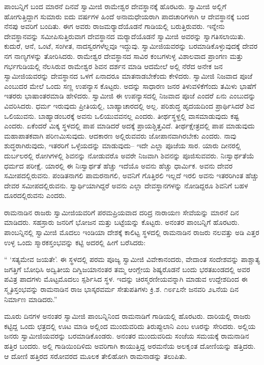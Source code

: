  ಪಾಂಬನ್ನಿಗೆ ಬಂದ ಮಾರನೆ ದಿನವೆ ಸ್ವಾಮೀಜಿ ರಾಮೇಶ್ವರ ದೇವಸ್ಥಾನಕ್ಕೆ ಹೊರಟರು. ಸ್ವಾಮೀಜಿ ಅಲ್ಲಿಗೆ ಹೋಗುತ್ತಿದ್ದಾಗ ಸುಮಾರು ಐದು ವರ್ಷಗಳ ಹಿಂದೆ ಅನಾಮಧೇಯರಾಗಿ ಪಾದಚಾರಿಗಳಾಗಿ ಆ ದೇವಸ್ಥಾನಕ್ಕೆ ಬಂದ ನೆನಪು ಅವರಿಗೆ ಬಂದಿತು. ಈಗ ಅವರು ರಾಜಮರ‍್ಯಾದೆಯೊಡನೆ ಗಾಡಿಯಲ್ಲಿ ಬರುತ್ತಿರುವರು. ಇನ್ನೇನು ದೇವಸ್ಥಾನವನ್ನು ಸಮೀಪಿಸುತ್ತಿರುವಾಗ ದೇವಸ್ಥಾನದ ಮರ‍್ಯಾದೆಯೊಡನೆ ಸ್ವಾಮೀಜಿ ಅವರನ್ನು ಸ್ವಾಗತಿಸಲಾಯಿತು. ಕುದುರೆ, ಆನೆ, ಒಂಟೆ, ಸಂಗೀತ, ನಾದಸ್ವರಗಳೆಲ್ಲವೂ ಇದ್ದುವು. ಸ್ವಾಮೀಜಿಯವರನ್ನು ಬರಮಾಡಿಕೊಳ್ಳುವುದಕ್ಕೆ ದೇವರ ನಗ ನಾಣ್ಯಗಳನ್ನು ತೋರಿಸಿದರು. ರಾಮೇಶ್ವರ ದೇವಸ್ಥಾನದ ಸಾವಿರ ಕಂಬಗಳುಳ್ಳ ವಿಶಾಲವಾದ ಪ್ರಾಂಗಣ ಮತ್ತು ಗರ್ಭಗುಡಿಯಲ್ಲಿ ನೆಲಸಿರುವ ರಾಮೇಶ್ವರ ಶಿವನ ದರ್ಶನ ಮಾಡಿ ಆದಮೇಲೆ ಅಲ್ಲಿ ನೆರೆದ ಅನೇಕ ಜನ ಸ್ವಾಮೀಜಿಯವರನ್ನು ದೇವಸ್ಥಾನದ ಒಳಗೆ ಏನಾದರೂ ಮಾತನಾಡಬೇಕೆಂದು ಕೇಳಿದರು. ಸ್ವಾಮೀಜಿ ನಿಜವಾದ ಪೂಜೆ ಎಂಬುದರ ಮೇಲೆ ಒಂದು ಸಣ್ಣ ಉಪನ್ಯಾಸ ಕೊಟ್ಟರು. ಅದನ್ನು ಸಾಧಾರಣ ಜನರ ತಿಳುವಳಿಕೆಗೆಂದು ತಮಿಳು ಭಾಷೆಗೆ ಇತರರು ಭಾಷಾಂತರಮಾಡಿ ಹೇಳಿದರು. ಸ್ವಾಮೀಜಿ ಈ ಉಪನ್ಯಾಸದಲ್ಲಿ ನಿಜವಾದ ಪೂಜೆ ಎಂದರೆ ಏನು ಎಂಬುದನ್ನು ವಿವರಿಸಿದರು. ಧರ್ಮ ಇರುವುದು ಪ್ರೀತಿಯಲ್ಲಿ, ಬಾಹ್ಯಾಚಾರದಲ್ಲಿ ಅಲ್ಲ. ಪರಿಶುದ್ಧ ಹೃದಯದಿಂದ ಪ್ರಾರ್ಥಿಸಿದರೆ ಶಿವ ಒಲಿಯುವನು. ಬಾಹ್ಯಾಡಂಬರಕ್ಕೆ ಅವನು ಒಲಿಯುವವನಲ್ಲ ಎಂದರು. ತೀರ್ಥಸ್ಥಳ್ದಲ್ಲಿ ವಾಸಮಾಡುವುದು ಕಷ್ಟ ಎಂದರು. ಏಕೆಂದರೆ ಮಿಕ್ಕ ಸ್ಥಳದಲ್ಲಿ ಪಾಪ ಮಾಡಿದರೆ ಅದಕ್ಕೆ ಪ್ರಾಯಶ್ಚಿತ್ತವಿದೆ. ತೀರ್ಥಕ್ಷೇತ್ರದಲ್ಲಿ ಪಾಪ ಮಾಡುವುದು ಮಹಾಪಾತಕವಾಗಿ ಪರಿಣಮಿಸುವುದು. ಆದಕಾರಣ ಅಲ್ಲಿರುವವರು ಜೋಪಾನವಾಗಿರಬೇಕು ಎಂದರು. ನಾವು ಶುದ್ಧರಾಗಿರುವುದು, ಇತರರಿಗೆ ಒಳ್ಳೆಯದನ್ನು ಮಾಡುವುದು– ಇದೇ ಎಲ್ಲಾ ಪೂಜೆಯ ಸಾರ. ಯಾರು ದೀನರಲ್ಲಿ ದುರ್ಬಲರಲ್ಲಿ ರೋಗಿಗಳಲ್ಲಿ ಶಿವನನ್ನು ನೋಡುವರೊ ಅವರೇ ನಿಜವಾಗಿ ಶಿವನನ್ನು ಪೂಜಿಸುವವರು. ನಿಃಸ್ವಾರ್ಥತೆಯೆ ಧರ್ಮದ ಪರೀಕ್ಷೆ. ಯಾರಲ್ಲಿ ಈ ನಿಃಸ್ವಾರ್ಥತೆ ಹೆಚ್ಚು ಇದೆಯೊ ಅವನು ಹೆಚ್ಚು ಧಾರ್ಮಿಕ. ಅವನು ದೇವರ ಸಮೀಪದಲ್ಲಿರುವನು. ಪಂಡಿತನಾಗಲಿ ಪಾಮರನಾಗಲಿ, ಅವನಿಗೆ ಗೊತ್ತಿರಲಿ ಇಲ್ಲದೆ ಇರಲಿ ಅವನು ಇತರರಿಗಿಂತ ಹೆಚ್ಚು ದೇವರ ಸಮೀಪದಲ್ಲಿರುವನು. ಸ್ವಾರ್ಥಿಯಾಗಿದ್ದರೆ ಅವನು ಎಲ್ಲಾ ದೇವಸ್ಥಾನಗಳನ್ನು ನೋಡಿದ್ದರೂ ಶಿವನಿಗೆ ಬಹಳ ದೂರದಲ್ಲಿರುವನು ಎಂದರು. 

 ರಾಮನಾಡಿನ ರಾಜರು ಸ್ವಾಮೀಜಿಯವರಿಗೆ ಪರಮಪ್ರಿಯವಾದ ದರಿದ್ರ ನಾರಾಯಣ ಸೇವೆಯನ್ನು ಮಾರನೆ ದಿನ ಮಾಡಿದರು. ಸಹಸ್ರಾರು ಜನರಿಗೆ ಭೋಜನ ಮತ್ತು ಬಟ್ಟೆಯನ್ನು ಕೊಟ್ಟರು. ಅನಂತರ ಪಾಂಬನ್ನಿಗೆ ಹೊರಟರು. ಪಾಂಬನ್ನಿನಲ್ಲಿ ಸ್ವಾಮೀಜಿ ಮೊದಲು ಇಂಡಿಯಾ ದೇಶಕ್ಕೆ ಕಾಲಿಟ್ಟ ಸ್ಥಳದಲ್ಲಿ ರಾಮನಾಡಿನ ರಾಜರು ನಲವತ್ತು ಅಡಿ ಎತ್ತರ ಉಳ್ಳ ಒಂದು ಸ್ಮಾರಕಸ್ತಂಭವನ್ನು ಕಟ್ಟಿ ಅದರಲ್ಲಿ ಹೀಗೆ ಬರೆಸಿದರು: 

 “ ‘ಸತ್ಯಮೇವ ಜಯತೇ’. ಈ ಸ್ಥಳದಲ್ಲಿ ಪರಮ ಪೂಜ್ಯ ಸ್ವಾಮೀಜಿ ವಿವೇಕಾನಂದರು, ವೇದಾಂತ ಸಂದೇಶವನ್ನು ಪಾಶ್ಚಾತ್ಯ ಜಗತ್ತಿಗೆ ಬೋಧಿಸಿ ಅದ್ವಿತೀಯ ದಿಗ್ವಿಜಯಾನಂತರ ತಮ್ಮ ಆಂಗ್ಲೇಯ ಶಿಷ್ಯರೊಡನೆ ಬಂದು ಭರತಖಂಡದಲ್ಲಿ ಅವರ ಪವಿತ್ರ ಪಾದಗಳು ಮೊಟ್ಟಮೊದಲು ಸ್ಪರ್ಶಿಸಿದ ಸ್ಥಳ. ಇದನ್ನು ಚಿರಸ್ಮರಣೀಯವನ್ನಾಗಿ ಮಾಡುವ ಉದ್ದೇಶದಿಂದ ಈ ಸ್ಮೃತಿಸ್ತಂಭವನ್ನು ರಾಮನಾಡಿನ ರಾಜ ಭಾಸ್ಕರವರ್ಮ ಸೇತುಪತಿಗಳು ಕ್ರಿ.ಶ. ೧೮೯೭ನೇ ಜನವರಿ ೨೬ನೆಯ ದಿನ ನಿರ್ಮಾಣ ಮಾಡಿದರು.” 

 ಮೂರು ದಿನಗಳ ಅನಂತರ ಸ್ವಾಮೀಜಿ ಪಾಂಬನ್ನಿನಿಂದ ರಾಮನಾಡಿಗೆ ಗಾಡಿಯಲ್ಲಿ ಹೊರಟರು. ದಾರಿಯಲ್ಲಿ ರಾಜರು ಕಟ್ಟಿದ್ದ ಒಂದು ಛತ್ರದಲ್ಲಿ ಊಟ ಮಾಡಿ ಅಲ್ಲಿಂದ ಮುಂದುವರಿದು ತಿರುಪ್ಪುಲಾನಿ ಎಂಬ ಊರನ್ನು ಸೇರಿದರು. ಅಲ್ಲಿಯ ಜನರು ಸ್ವಾಮೀಜಿಯವರನ್ನು ಬರಮಾಡಿಕೊಂಡರು. ಅನಂತರ ಮುಂದುವರಿದು ಸಂಜೆಯ ಸಮಯಕ್ಕೆ ರಾಮನಾಡಿನ ಹತ್ತಿರ ಬಂದರು. ಅಲ್ಲಿ ಗಾಡಿಯಿಂದಿಳಿದು ಅವರಿಗಾಗಿ ಕಾಯುತ್ತಿದ್ದ ಅರಮನೆಯ ಅಲಕೃಂತ ದೋಣಿಯನ್ನು ಹತ್ತಿದರು. ಆ ದೋಣಿ ಹತ್ತಿರದ ಸರೋವರದ ಮೂಲಕ ತೇಲಿಹೋಗಿ ರಾಮನಾಡನ್ನು ತಲುಪಿತು. 

